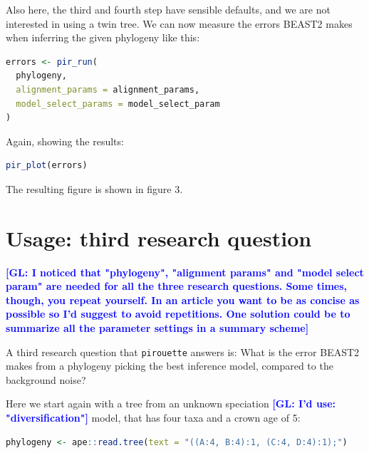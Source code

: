 \documentclass{article}
\newcommand{\giovanni}[1]{\textcolor{blue}{\textbf{[GL: #1]}}}
\begin{document}
Also here, the third and fourth step have sensible defaults, and we are not
interested in using a twin tree. We can now measure the errors BEAST2
makes when inferring the given phylogeny like this:

\begin{lstlisting}[language=R, floatplacement=H]
errors <- pir_run(
  phylogeny,
  alignment_params = alignment_params,
  model_select_params = model_select_param
)
\end{lstlisting}

Again, showing the results:

\begin{lstlisting}[language=R, floatplacement=H]
pir_plot(errors)
\end{lstlisting}

The resulting figure is shown in figure 3.

\section{Usage: third research question}

\giovanni{I noticed that "phylogeny", "alignment params" and "model select param" are needed for all the three research questions. Some times, though, you repeat yourself. In an article you want to be as concise as possible so I'd suggest to avoid repetitions. One solution could be to summarize all the parameter settings in a summary scheme}

A third research question that \verb;pirouette; answers is:
What is the error BEAST2 makes from a phylogeny 
picking the best inference model, compared to the background noise?

Here we start again with a tree from an unknown speciation \giovanni{I'd use: "diversification"} model,
that has four taxa and a crown age of 5:

\begin{lstlisting}[language=R, floatplacement=H]
phylogeny <- ape::read.tree(text = "((A:4, B:4):1, (C:4, D:4):1);")
\end{lstlisting}
\end{document}
